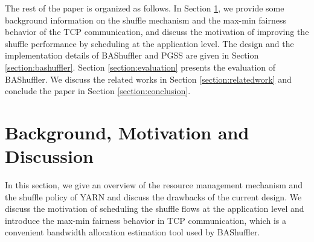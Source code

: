 \documentclass[10pt,journal,compsoc]{IEEEtran}
\begin{document}



The rest of the paper is organized as follows.
In Section \ref{section:background}, we provide some background information on the shuffle mechanism
and the max-min fairness behavior of the TCP communication, and discuss the motivation of improving the shuffle performance by scheduling at the application level.
The design and the implementation details of BAShuffler and PGSS
are given in Section \ref{section:bashuffler}.
Section \ref{section:evaluation} presents the evaluation of BAShuffler.
We discuss the related works in Section \ref{section:relatedwork} and
conclude the paper in Section \ref{section:conclusion}. 



\section{Background, Motivation and Discussion}\label{section:background}
In this section, we give an overview of the resource management mechanism
and the shuffle policy of YARN and discuss the drawbacks of the current design. 
We discuss the motivation of scheduling the shuffle flows at the application level
and introduce the max-min fairness behavior in TCP communication, which is
a convenient bandwidth allocation estimation tool used by BAShuffler. 
\end{document}
